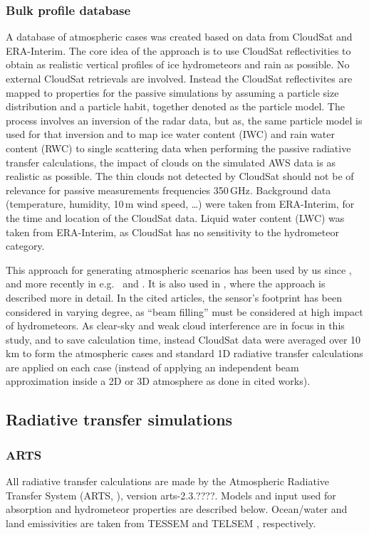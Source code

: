 \documentclass[12pt]{article}
\begin{document}
\subsubsection{Bulk profile database}
%
A database of atmospheric cases was created based on data from CloudSat and
ERA-Interim. The core idea of the approach is to use CloudSat reflectivities to
obtain as realistic vertical profiles of ice hydrometeors and rain as
possible. No external CloudSat retrievals are involved. Instead the CloudSat
reflectivites are mapped to properties for the passive simulations by assuming
a particle size distribution and a particle habit, together denoted as
the particle model. The process involves an inversion of the radar data, but as,
the same particle model is used for that inversion and to map ice water content
(IWC) and rain water content (RWC) to single scattering data when performing
the passive radiative transfer calculations, the impact of clouds on the
simulated AWS data is as realistic as possible. The thin clouds not detected by
CloudSat should not be of relevance for passive measurements frequencies
350\,GHz. Background data (temperature, humidity, 10\,m wind speed, \dots) were
taken from ERA-Interim, for the time and location of the CloudSat data. Liquid
water content (LWC) was taken from ERA-Interim, as CloudSat has no sensitivity
to the hydrometeor category.

This approach for generating atmospheric scenarios has been used by us since
\citet{rydberg:nonga:09}, and more recently in e.g.\
\citet{eriksson:towar:20} and \citet{barlakas:three:20}. It is also used in
\citet{ekelund:using:20}, where the approach is described more in detail. In
the cited articles, the sensor's footprint has been considered in varying
degree, as ``beam filling'' must be considered at high impact of hydrometeors.
As clear-sky and weak cloud interference are in focus in this study, and to
save calculation time, instead CloudSat data were averaged over 10\,km to form
the atmospheric cases and standard 1D radiative transfer calculations are
applied on each case (instead of applying an independent beam approximation
inside a 2D or 3D atmosphere as done in cited works).



\subsection{Radiative transfer simulations}
%
\subsubsection{ARTS}
%
All radiative transfer calculations are made by the Atmospheric Radiative
Transfer System (ARTS, \citet{eriksson:arts2:11,buehler:artst:18}), version
arts-2.3.????. Models and input used for absorption and hydrometeor properties
are described below. Ocean/water and land emissivities are taken from
TESSEM \citep{prigent2017sea} and TELSEM \citep{aires2011tool}, respectively.
\end{document}
